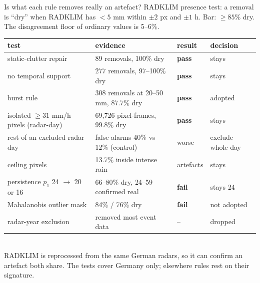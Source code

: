 \documentclass[aspectratio=169,10pt]{beamer}
\newcommand{\pass}{\textbf{pass}}
\newcommand{\fail}{\textbf{fail}}
\begin{document}
\begin{frame}{Is what each rule removes really an artefact?}
  \footnotesize
  RADKLIM presence test: a removal is ``dry'' when RADKLIM has $<5$ mm within $\pm 2$ px and
  $\pm 1$ h. Bar: $\ge 85\%$ dry. The disagreement floor of ordinary values is 5--6\%.\\[4pt]
  \begin{tabular}{llll}
    \toprule
    test & evidence & result & decision \\
    \midrule
    static-clutter repair & 89 removals, 100\% dry & \pass & stays \\
    no temporal support & 277 removals, 97--100\% dry & \pass & stays \\
    burst rule & 308 removals at 20--50 mm, 87.7\% dry & \pass & adopted \\
    isolated $\ge 31$ mm/h pixels (radar-day) & 69{,}726 pixel-frames, 99.8\% dry & \pass & stays \\
    rest of an excluded radar-day & false alarms 40\% vs 12\% (control) & worse & exclude whole day \\
    ceiling pixels & 13.7\% inside intense rain & artefacts & stays \\
    persistence $p_1$ 24 $\to$ 20 or 16 & 66--80\% dry, 24--59 confirmed real & \fail & stays 24 \\
    Mahalanobis outlier mask & 84\% / 76\% dry & \fail & not adopted \\
    radar-year exclusion & removed most event data & -- & dropped \\
    \bottomrule
  \end{tabular}\\[4pt]
  RADKLIM is reprocessed from the same German radars, so it can confirm an artefact both share.
  The tests cover Germany only; elsewhere rules rest on their signature.
\end{frame}
\end{document}

